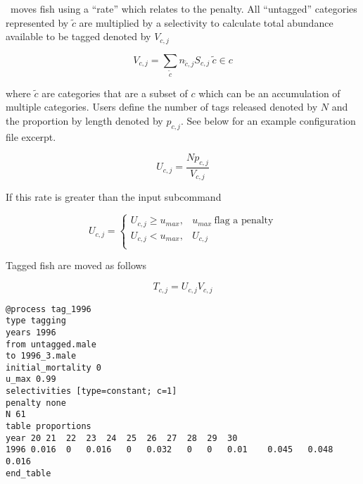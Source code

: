 \CNAME\ moves fish using a \enquote{rate} which relates to the penalty. All \enquote{untagged} categories represented by \(\tilde{c}\) are multiplied by a selectivity to calculate total abundance available to be tagged denoted by \(V_{c,j}\)

\begin{equation*}
	V_{c,j} = \sum\limits_{\tilde{c}} n_{\tilde{c}, j} S_{c,j} \ \tilde{c} \in c
\end{equation*}

where \(\tilde{c}\) are categories that are a subset of \(c\) which can be an accumulation of multiple categories. Users define the number of tags released denoted by \(N\) and the proportion by length denoted by \(p_{c,j}\). See below for an example configuration file excerpt.

\begin{equation*}
U_{c,j} = \frac{Np_{c,j}}{V_{c,j}}
\end{equation*}

If this rate is greater than the input subcommand 

\begin{equation*}
U_{c,j} = 
\begin{cases}
	U_{c,j} \geq u_{max}, & u_{max} \ \text{flag a penalty}\\
	U_{c,j} < u_{max}, & U_{c,j} \\
\end{cases}
\end{equation*}

Tagged fish are moved as follows

\begin{equation*}
	T_{c,j} = U_{c,j} V_{c,j}
\end{equation*}

{\small{\begin{verbatim}
@process tag_1996
type tagging
years 1996
from untagged.male
to 1996_3.male
initial_mortality 0
u_max 0.99
selectivities [type=constant; c=1]
penalty none
N 61
table proportions
year 20	21	22	23	24	25	26	27	28	29	30
1996 0.016	0	0.016	0	0.032	0	0	0.01	0.045	0.048	0.016	
end_table
\end{verbatim}}}
